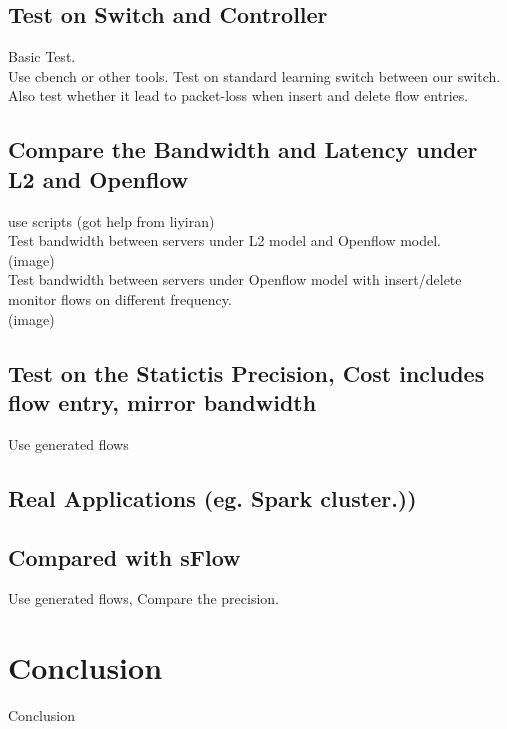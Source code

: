\documentclass{acm_proc_article-sp}
\begin{document}
\subsection{Test on Switch and Controller}
Basic Test.\\
Use cbench or other tools. Test on standard learning switch between our switch.\\
Also test whether it lead to packet-loss when insert and delete flow entries.\\

\subsection{Compare the Bandwidth and Latency under L2 and Openflow}
use scripts (got help from liyiran)\\
Test bandwidth between servers under L2 model and Openflow model.\\
(image)\\
Test bandwidth between servers under Openflow model with insert/delete monitor flows on different frequency.\\
(image)\\

\subsection{Test on the Statictis Precision, Cost includes flow entry, mirror bandwidth}
Use generated flows\\

\subsection{Real Applications (eg. Spark cluster.))}

\subsection{Compared with sFlow}
Use generated flows, Compare the precision.\\

\section{Conclusion}
Conclusion\\




\end{document}
